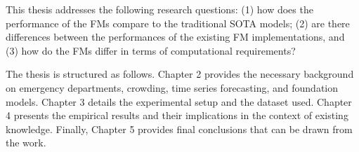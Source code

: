 This thesis addresses the following research questions: (1) how does the performance of the FMs compare to the traditional SOTA models; (2) are there differences between the performances of the existing FM implementations, and (3) how do the FMs differ in terms of computational requirements? 

The thesis is structured as follows. Chapter 2 provides the necessary background on emergency departments, crowding, time series forecasting, and foundation models. Chapter 3 details the experimental setup and the dataset used. Chapter 4 presents the empirical results and their implications in the context of existing knowledge. Finally, Chapter 5 provides final conclusions that can be drawn from the work.